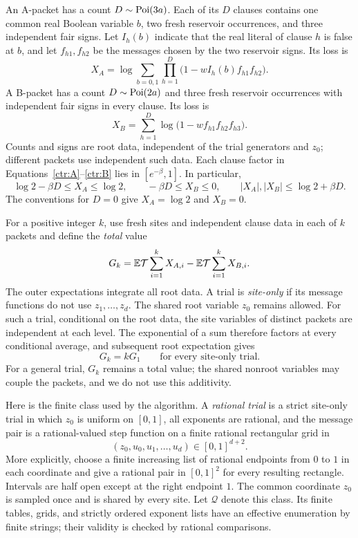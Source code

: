An A-packet has a count $D\sim\operatorname{Poi}(3a)$.  Each of its $D$ clauses contains
one common real Boolean variable $b$, two fresh reservoir occurrences, and
three independent fair signs.  Let $I_h(b)$ indicate that the real literal
of clause $h$ is false at $b$, and let $f_{h1},f_{h2}$ be the messages chosen
by the two reservoir signs.  Its loss is
\begin{equation}
 X_A=\log\sum_{b=0,1}\prod_{h=1}^{D}
       \bigl(1-wI_h(b)f_{h1}f_{h2}\bigr).
 \label{ctr:A}
\end{equation}
A B-packet has a count $D\sim\operatorname{Poi}(2a)$ and three fresh reservoir occurrences
with independent fair signs in every clause.  Its loss is
\begin{equation}
 X_B=\sum_{h=1}^{D}\log\bigl(1-wf_{h1}f_{h2}f_{h3}\bigr).
 \label{ctr:B}
\end{equation}
Counts and signs are root data, independent of the trial generators and
$z_0$; different packets use independent such data.  Each clause factor in
Equations~\eqref{ctr:A}--\eqref{ctr:B} lies in $[e^{-\beta},1]$.  In
particular,
\begin{equation}
 \log2-\beta D\le X_A\le\log2,\qquad
 -\beta D\le X_B\le0,\qquad
 |X_A|,|X_B|\le\log2+\beta D.
 \label{ctr:packet-bound}
\end{equation}
The conventions for $D=0$ give $X_A=\log2$ and $X_B=0$.

For a positive integer $k$, use fresh sites and independent clause data in
each of $k$ packets and define the \emph{total} value
\begin{equation}
 G_k=\mathbb E\mathcal T\sum_{i=1}^kX_{A,i}
       -\mathbb E\mathcal T\sum_{i=1}^kX_{B,i}.
 \label{ctr:G}
\end{equation}
The outer expectations integrate all root data.  A trial is \emph{site-only}
if its message functions do not use $z_1,\ldots,z_d$.  The shared root
variable $z_0$ remains allowed.  For such a trial, conditional on the root
data, the site variables of distinct packets are independent at each level.
The exponential of a sum therefore factors at every conditional average,
and subsequent root expectation gives
\begin{equation}
 G_k=kG_1\qquad\text{for every site-only trial.}
 \label{ctr:additive}
\end{equation}
For a general trial, $G_k$ remains a total value; the shared nonroot
variables may couple the packets, and we do not use this additivity.

Here is the finite class used by the algorithm.  A \emph{rational trial}
is a strict site-only trial in which $z_0$ is uniform on $[0,1]$, all
exponents are rational, and the message pair is a rational-valued step
function on a finite rational rectangular grid in
\[
 (z_0,u_0,u_1,\ldots,u_d)\in[0,1]^{d+2}.
\]
More explicitly, choose a finite increasing list of rational endpoints
from $0$ to $1$ in each coordinate and give a rational pair in $[0,1]^2$
for every resulting rectangle.  Intervals are half open except at the
right endpoint $1$.  The common coordinate $z_0$ is sampled once and is
shared by every site.  Let $\mathcal Q$ denote this class.  Its finite tables,
grids, and strictly ordered exponent lists have an effective enumeration by
finite strings; their validity is checked by rational comparisons.

